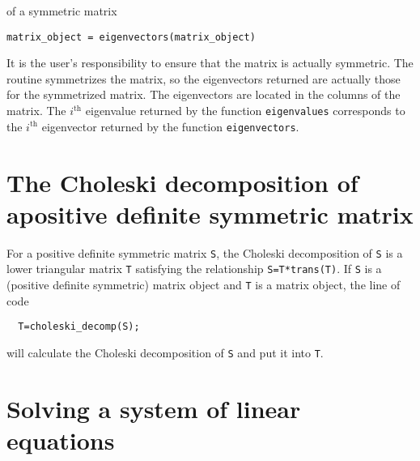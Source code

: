  {of a symmetric matrix}
\begin{lstlisting}
matrix_object = eigenvectors(matrix_object)
\end{lstlisting}

 It is the user's responsibility to 
ensure that the matrix is actually symmetric. The routine symmetrizes 
the matrix, so the eigenvectors returned are actually those for
the symmetrized matrix. The eigenvectors are located in the
columns of the matrix. The $i^\textrm{th}$ eigenvalue returned by the
function \texttt{eigenvalues} corresponds to the $i^\textrm{th}$ eigenvector  
returned by the function \texttt{eigenvectors}.


\section{The Choleski decomposition of a\br positive definite symmetric matrix}

For a positive definite symmetric matrix \texttt{S}, the
Choleski decomposition of \texttt{S} is a lower triangular matrix \texttt{T}
satisfying the relationship \texttt{S=T*trans(T)}. 
If \texttt{S} is a (positive definite symmetric) matrix object and
\texttt{T} is a matrix object, the line of code
\begin{lstlisting}
  T=choleski_decomp(S);
\end{lstlisting}
will calculate the Choleski decomposition of \texttt{S} and put it
into \texttt{T}.


\section{Solving a system of linear equations}

